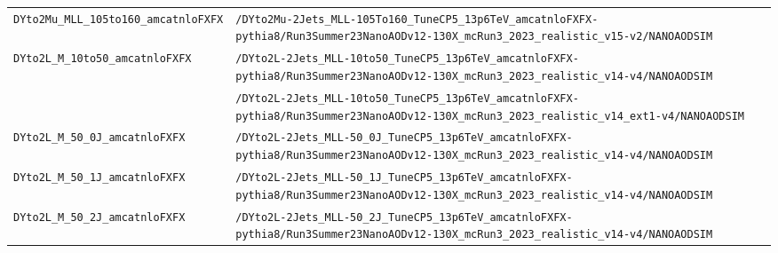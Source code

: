 \begin{longtable}{@{}>{\RaggedRight\arraybackslash}p{} >{\RaggedRight\arraybackslash}p{}@{}}
\addlinespace[2pt]
\texttt{DYto2Mu\_\allowbreak{}MLL\_\allowbreak{}105to160\_\allowbreak{}amcatnloFXFX} & \texttt{/\allowbreak{}DYto2Mu-\allowbreak{}2Jets\_\allowbreak{}MLL-\allowbreak{}105To160\_\allowbreak{}TuneCP5\_\allowbreak{}13p6TeV\_\allowbreak{}amcatnloFXFX-\allowbreak{}pythia8/\allowbreak{}Run3Summer23NanoAODv12-\allowbreak{}130X\_\allowbreak{}mcRun3\_\allowbreak{}2023\_\allowbreak{}realistic\_\allowbreak{}v15-\allowbreak{}v2/\allowbreak{}NANOAODSIM} \\
\addlinespace[2pt]
\texttt{DYto2L\_\allowbreak{}M\_\allowbreak{}10to50\_\allowbreak{}amcatnloFXFX} & \texttt{/\allowbreak{}DYto2L-\allowbreak{}2Jets\_\allowbreak{}MLL-\allowbreak{}10to50\_\allowbreak{}TuneCP5\_\allowbreak{}13p6TeV\_\allowbreak{}amcatnloFXFX-\allowbreak{}pythia8/\allowbreak{}Run3Summer23NanoAODv12-\allowbreak{}130X\_\allowbreak{}mcRun3\_\allowbreak{}2023\_\allowbreak{}realistic\_\allowbreak{}v14-\allowbreak{}v4/\allowbreak{}NANOAODSIM} \\
 & \texttt{/\allowbreak{}DYto2L-\allowbreak{}2Jets\_\allowbreak{}MLL-\allowbreak{}10to50\_\allowbreak{}TuneCP5\_\allowbreak{}13p6TeV\_\allowbreak{}amcatnloFXFX-\allowbreak{}pythia8/\allowbreak{}Run3Summer23NanoAODv12-\allowbreak{}130X\_\allowbreak{}mcRun3\_\allowbreak{}2023\_\allowbreak{}realistic\_\allowbreak{}v14\_\allowbreak{}ext1-\allowbreak{}v4/\allowbreak{}NANOAODSIM} \\
\addlinespace[2pt]
\texttt{DYto2L\_\allowbreak{}M\_\allowbreak{}50\_\allowbreak{}0J\_\allowbreak{}amcatnloFXFX} & \texttt{/\allowbreak{}DYto2L-\allowbreak{}2Jets\_\allowbreak{}MLL-\allowbreak{}50\_\allowbreak{}0J\_\allowbreak{}TuneCP5\_\allowbreak{}13p6TeV\_\allowbreak{}amcatnloFXFX-\allowbreak{}pythia8/\allowbreak{}Run3Summer23NanoAODv12-\allowbreak{}130X\_\allowbreak{}mcRun3\_\allowbreak{}2023\_\allowbreak{}realistic\_\allowbreak{}v14-\allowbreak{}v4/\allowbreak{}NANOAODSIM} \\
\addlinespace[2pt]
\texttt{DYto2L\_\allowbreak{}M\_\allowbreak{}50\_\allowbreak{}1J\_\allowbreak{}amcatnloFXFX} & \texttt{/\allowbreak{}DYto2L-\allowbreak{}2Jets\_\allowbreak{}MLL-\allowbreak{}50\_\allowbreak{}1J\_\allowbreak{}TuneCP5\_\allowbreak{}13p6TeV\_\allowbreak{}amcatnloFXFX-\allowbreak{}pythia8/\allowbreak{}Run3Summer23NanoAODv12-\allowbreak{}130X\_\allowbreak{}mcRun3\_\allowbreak{}2023\_\allowbreak{}realistic\_\allowbreak{}v14-\allowbreak{}v4/\allowbreak{}NANOAODSIM} \\
\addlinespace[2pt]
\texttt{DYto2L\_\allowbreak{}M\_\allowbreak{}50\_\allowbreak{}2J\_\allowbreak{}amcatnloFXFX} & \texttt{/\allowbreak{}DYto2L-\allowbreak{}2Jets\_\allowbreak{}MLL-\allowbreak{}50\_\allowbreak{}2J\_\allowbreak{}TuneCP5\_\allowbreak{}13p6TeV\_\allowbreak{}amcatnloFXFX-\allowbreak{}pythia8/\allowbreak{}Run3Summer23NanoAODv12-\allowbreak{}130X\_\allowbreak{}mcRun3\_\allowbreak{}2023\_\allowbreak{}realistic\_\allowbreak{}v14-\allowbreak{}v4/\allowbreak{}NANOAODSIM} \\

\end{longtable}
